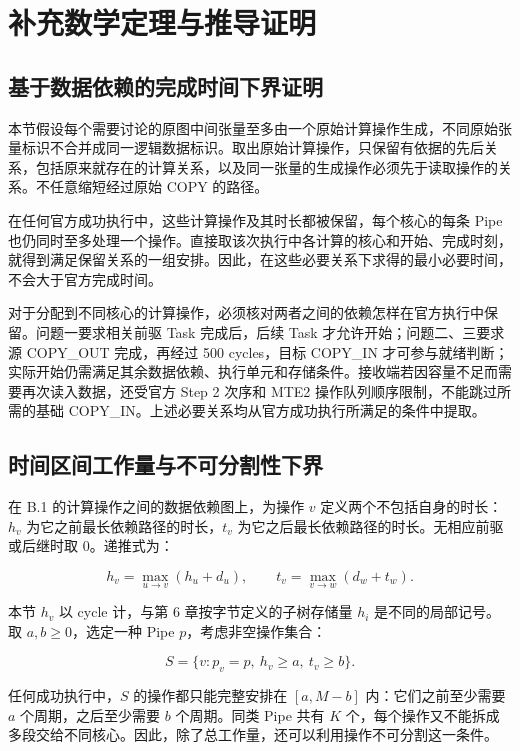 \documentclass[anonymous,withtoc]{gmcm2026}
\begin{document}
\section{补充数学定理与推导证明}

\subsection{基于数据依赖的完成时间下界证明}

本节假设每个需要讨论的原图中间张量至多由一个原始计算操作生成，不同原始张量标识不合并成同一逻辑数据标识。取出原始计算操作，只保留有依据的先后关系，包括原来就存在的计算关系，以及同一张量的生成操作必须先于读取操作的关系。不任意缩短经过原始 COPY 的路径。

在任何官方成功执行中，这些计算操作及其时长都被保留，每个核心的每条 Pipe 也仍同时至多处理一个操作。直接取该次执行中各计算的核心和开始、完成时刻，就得到满足保留关系的一组安排。因此，在这些必要关系下求得的最小必要时间，不会大于官方完成时间。

对于分配到不同核心的计算操作，必须核对两者之间的依赖怎样在官方执行中保留。问题一要求相关前驱 Task 完成后，后续 Task 才允许开始；问题二、三要求源 COPY\_OUT 完成，再经过 500 cycles，目标 COPY\_IN 才可参与就绪判断；实际开始仍需满足其余数据依赖、执行单元和存储条件。接收端若因容量不足而需要再次读入数据，还受官方 Step 2 次序和 MTE2 操作队列顺序限制，不能跳过所需的基础 COPY\_IN。上述必要关系均从官方成功执行所满足的条件中提取。

\subsection{时间区间工作量与不可分割性下界}

在 B.1 的计算操作之间的数据依赖图上，为操作 \(v\) 定义两个不包括自身的时长：\(h_v\) 为它之前最长依赖路径的时长，\(t_v\) 为它之后最长依赖路径的时长。无相应前驱或后继时取 0。递推式为：

\begin{equation}
h_v = \max_{u \to v}(h_u + d_u), \qquad t_v = \max_{v \to w}(d_w + t_w).
\end{equation}

本节 \(h_v\) 以 cycle 计，与第 6 章按字节定义的子树存储量 \(h_i\) 是不同的局部记号。取 \(a, b \ge 0\)，选定一种 Pipe \(p\)，考虑非空操作集合：

\begin{equation}
S = \{v: p_v = p, \ h_v \ge a, \ t_v \ge b\}.
\end{equation}

任何成功执行中，\(S\) 的操作都只能完整安排在 \([a, M - b]\) 内：它们之前至少需要 \(a\) 个周期，之后至少需要 \(b\) 个周期。同类 Pipe 共有 \(K\) 个，每个操作又不能拆成多段交给不同核心。因此，除了总工作量，还可以利用操作不可分割这一条件。
\end{document}
